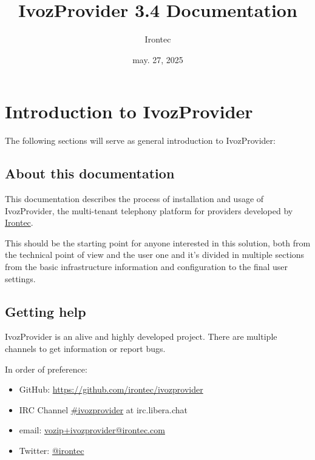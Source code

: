 \documentclass[letterpaper,10pt,spanish]{sphinxmanual}
\title{IvozProvider 3.4 Documentation}
\date{may. 27, 2025}
\author{Irontec}
\begin{document}
\maketitle
\tableofcontents
{}\label{index::doc}



\chapter{Introduction to IvozProvider}
\label{basic_concepts/intro/index::doc}\label{basic_concepts/intro/index:introduction-to-ivozprovider}\label{basic_concepts/intro/index:ivozprovider-official-documentation}
The following sections will serve as general introduction to IvozProvider:


\section{About this documentation}
\label{basic_concepts/intro/about::doc}\label{basic_concepts/intro/about:about-this-documentation}
This documentation describes the process of installation and usage of
IvozProvider, the multi-tenant telephony platform for providers developed
by \href{http://irontec.com}{Irontec}.

This should be the starting point for anyone interested in this solution,
both from the technical point of view and the user one and it's divided
in multiple sections from the basic infrastructure information and configuration
to the final user settings.


\section{Getting help}
\label{basic_concepts/intro/getting_help:getting-help}\label{basic_concepts/intro/getting_help::doc}\label{basic_concepts/intro/getting_help:id1}
IvozProvider is an alive and highly developed project. There are
multiple channels to get information or report bugs.

In order of preference:
\begin{itemize}
\item {} 
GitHub: \url{https://github.com/irontec/ivozprovider}

\item {} 
IRC Channel \href{https://kiwiirc.com/nextclient/irc.libera.chat/\#ivozprovider}{\#ivozprovider} at irc.libera.chat

\item {} 
email: \href{mailto:vozip+ivozprovider@irontec.com}{vozip+ivozprovider@irontec.com}

\item {} 
Twitter: \href{https://twitter.com/irontec}{@irontec}

\end{itemize}
\end{document}

